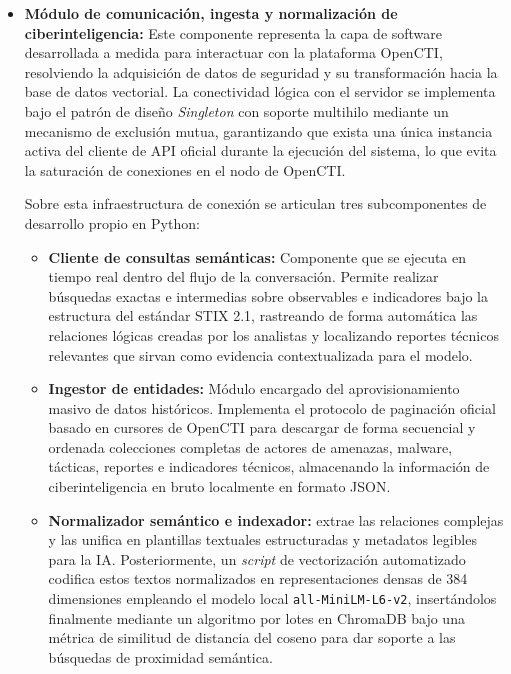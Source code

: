\documentclass[12pt]{report}
\begin{document}
\begin{itemize}
    \item \textbf{Módulo de comunicación, ingesta y normalización de ciberinteligencia:} Este componente representa la capa de software desarrollada a medida para interactuar con la plataforma OpenCTI, resolviendo la adquisición de datos de seguridad y su transformación hacia la base de datos vectorial. La conectividad lógica con el servidor se implementa bajo el patrón de diseño \textit{Singleton} con soporte multihilo mediante un mecanismo de exclusión mutua, garantizando que exista una única instancia activa del cliente de API oficial durante la ejecución del sistema, lo que evita la saturación de conexiones en el nodo de OpenCTI.

Sobre esta infraestructura de conexión se articulan tres subcomponentes de desarrollo propio en Python:
\begin{itemize}
    \item \textbf{Cliente de consultas semánticas:} Componente que se ejecuta en tiempo real dentro del flujo de la conversación. Permite realizar búsquedas exactas e intermedias sobre observables e indicadores bajo la estructura del estándar STIX 2.1, rastreando de forma automática las relaciones lógicas creadas por los analistas y localizando reportes técnicos relevantes que sirvan como evidencia contextualizada para el modelo.
    \item \textbf{Ingestor de entidades:} Módulo encargado del aprovisionamiento masivo de datos históricos. Implementa el protocolo de paginación oficial basado en cursores de OpenCTI para descargar de forma secuencial y ordenada colecciones completas de actores de amenazas, malware, tácticas, reportes e indicadores técnicos, almacenando la información de ciberinteligencia en bruto localmente en formato JSON.
    \item \textbf{Normalizador semántico e indexador:} extrae las relaciones complejas y las unifica en plantillas textuales estructuradas y metadatos legibles para la IA. Posteriormente, un \textit{script} de vectorización automatizado codifica estos textos normalizados en representaciones densas de 384 dimensiones empleando el modelo local \texttt{all-MiniLM-L6-v2}, insertándolos finalmente mediante un algoritmo por lotes en ChromaDB bajo una métrica de similitud de distancia del coseno para dar soporte a las búsquedas de proximidad semántica.
\end{itemize}
\end{itemize}
\end{document}
